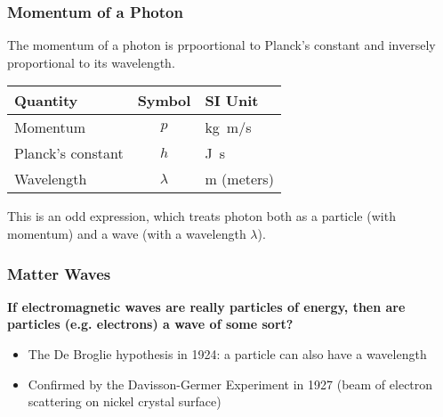 \documentclass[12pt,compress,aspectratio=169]{beamer}
\newcommand{\pic}[2]{\texttt{[image: \#2]}}
\begin{document}
\begin{frame}
  \frametitle{Momentum of a Photon}
  The momentum of a photon is prpoortional to Planck's constant and 
  inversely proportional to its wavelength.


  \begin{center}
    \begin{tabular}{l|c|l}
      \rowcolor{pink}
      \textbf{Quantity} & \textbf{Symbol} & \textbf{SI Unit} \\ \hline
      Momentum          & $p$ & \si{\kilo\gram.\metre/\second}\\
      Planck's constant & $h$ & \si{\joule.\second}\\
      Wavelength        & $\lambda$ & \si{\metre} (meters) \\
    \end{tabular}
  \end{center}

  This is an odd expression, which treats photon both as a particle (with
  momentum) and a wave (with a wavelength $\lambda$).
\end{frame}




\begin{frame}
  \frametitle{Matter Waves}
  \textbf{If electromagnetic waves are really particles of energy, then are
    particles (e.g. electrons) a wave of some sort?}
  \begin{itemize}
  \item The De Broglie hypothesis in 1924: a particle can also have a
    wavelength
  \item Confirmed by the Davisson-Germer Experiment in 1927 (beam of electron
    scattering on nickel crystal surface)
  \end{itemize}
\end{frame}
\end{document}
